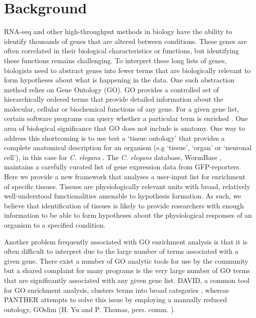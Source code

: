 \documentclass{bmcart}
\begin{document}
\section*{Background}
	RNA-seq and other high-throughput methods in biology have the ability to identify thousands of genes that are altered between conditions. These genes are often correlated in their biological characteristics or functions, but identifying these functions remains challenging. To interpret these long lists of genes, biologists need to abstract genes into fewer terms that are biologically relevant to form hypotheses about what is happening in the data. One such abstraction method relies on Gene Ontology (GO). GO provides a controlled set of hierarchically ordered terms  \cite{TheGeneOntologyConsortium2000, Ontology2009, TheGeneOntologyConsortium2015} that provide detailed information about the molecular, cellular or biochemical functions of any gene. For a given gene list, certain software programs can query whether a particular term is enriched  \cite{Mi2009, McLean2010, Huang2009}. One area of biological significance that GO does not include is anatomy. One way to address this shortcoming is to use test a `tissue ontology' that provides a complete anatomical description for an organism (e.g `tissue', `organ' or `neuronal cell'), in this case for \emph{C. elegans} \cite{Lee2003}.  The  \emph{C. elegans} database, WormBase \cite{Harris2014}, maintains a carefully curated list of gene expression data from GFP-reporters. Here we provide a new framework that analyses a user-input list for enrichment of specific tissues. Tissues are physiologically relevant units with broad, relatively well-understood functionalities amenable to hypothesis formation. As such, we believe that identification of tissues is likely to provide researchers with enough information to be able to form hypotheses about the physiological responses of an organism to a specified condition. 
	
	Another problem frequently associated with GO enrichment analysis is that it is often difficult to interpret due to the large number of terms associated with a given gene. There exist a number of GO analytic tools for use by the community but a shared complaint for many programs is the very large number of GO terms that are significantly associated with any given gene list. DAVID, a common tool for GO enrichment analysis, clusters terms into broad categories  \cite{Huang2007}, whereas PANTHER \cite{Mi2009, Mi2013} attempts to solve this issue by employing a manually reduced ontology, GOslim (H. Yu and P. Thomas, pers. comm. ).
	
\end{document}
